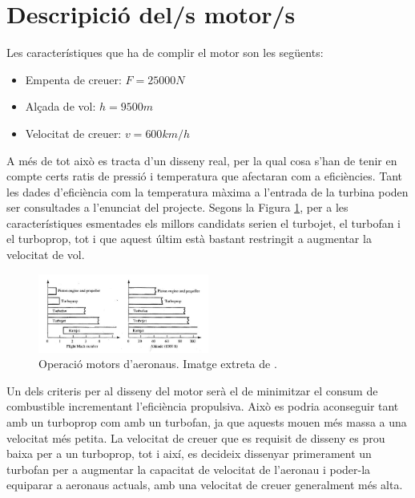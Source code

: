 \section{Descripició del/s motor/s}
\label{descripcio}
Les característiques que ha de complir el motor son les següents:
\begin{itemize}
\item Empenta de creuer: $F=25000N$
\item Alçada de vol: $h=9500m$
\item Velocitat de creuer: $v=600km/h$
\end{itemize}
A més de tot això es tracta d'un disseny real, per la qual cosa s'han de tenir en compte certs ratis de pressió i temperatura que afectaran com a eficiències. Tant les dades d'eficiència com la temperatura màxima a l'entrada de la turbina poden ser consultades a l'enunciat del projecte.
Segons la Figura \ref{operacio}, per a les característiques esmentades els millors candidats serien el turbojet, el turbofan i el turboprop, tot i que aquest últim està bastant restringit a augmentar la velocitat de vol.
\begin{figure}[H]
\centering
\includegraphics[width=0.5\textwidth]{./pics/seleccio.JPG} 
\caption{Operació motors d'aeronaus. Imatge extreta de \cite{mattingly}.}
\label{operacio}
\end{figure}
\noindent Un dels criteris per al disseny del motor serà el de minimitzar el consum de combustible incrementant l'eficiència propulsiva. Això es podria aconseguir tant amb un turboprop com amb un turbofan, ja que aquests mouen més massa a una velocitat més petita. La velocitat de creuer que es requisit de disseny es prou baixa per a un turboprop, tot i així, es decideix dissenyar primerament un turbofan per a augmentar la capacitat de velocitat de l'aeronau i poder-la equiparar a aeronaus actuals, amb una velocitat de creuer generalment més alta. 